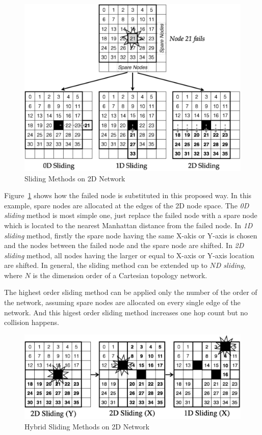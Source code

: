 \begin{figure}[ht]
\begin{center}
\includegraphics[width=0.95\columnwidth]{Figs/SlidingSubstitution.pdf}
  \caption{Sliding Methods on 2D Network}
  \label{fig:sliding-methods}
\end{center}
\end{figure}

Figure~\ref{fig:sliding-methods} shows how the failed node is
substituted in this proposed way. In this example, spare nodes are
allocated at the edges of the 2D node space. The {\em 0D sliding}
method is most simple one, just replace the failed node with a spare
node which is located to the nearest Manhattan distance from the
failed node. In {\em 1D sliding} method, firstly the spare node having
the same X-akis or Y-axis is chosen and the nodes between the failed
node and the spare node are shifted. In {\em 2D sliding} method, all
nodes having the larger or equal to X-axis or Y-axis location are
shifted. In general, the sliding method can be extended up to {\em
$N$D sliding}, where $N$ is the dimension order of a Cartesian
topology network. 

The highest order sliding method can be applied only the number of the
order of the network, assuming spare nodes are allocated on every
single edge of the network. And this higest order sliding method
increases one hop count but no collision happens.

\begin{figure}[ht]
\begin{center}
\includegraphics[width=0.95\columnwidth]{Figs/HybridSliding.pdf}
  \caption{Hybrid Sliding Methods on 2D Network}
  \label{fig:hybrid-methods}
\end{center}
\end{figure}

